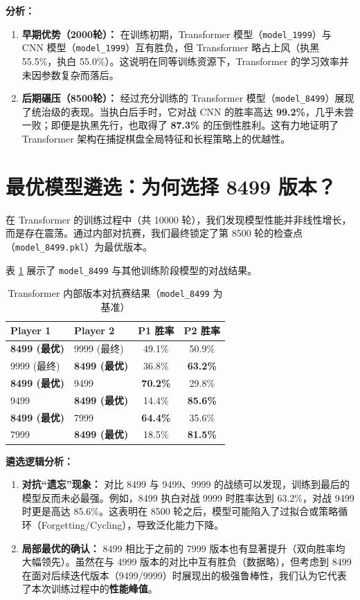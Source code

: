 \documentclass[oneside]{ctexbook}
\begin{document}
\textbf{分析：}
\begin{enumerate}
    \item \textbf{早期优势（2000轮）：} 在训练初期，Transformer 模型（\texttt{model\_1999}）与 CNN 模型（\texttt{model\_1999}）互有胜负，但 Transformer 略占上风（执黑 55.5\%，执白 55.0\%）。这说明在同等训练资源下，Transformer 的学习效率并未因参数复杂而落后。
    \item \textbf{后期碾压（8500轮）：} 经过充分训练的 Transformer 模型（\texttt{model\_8499}）展现了统治级的表现。当执白后手时，它对战 CNN 的胜率高达 \textbf{99.2\%}，几乎未尝一败；即便是执黑先行，也取得了 \textbf{87.3\%} 的压倒性胜利。这有力地证明了 Transformer 架构在捕捉棋盘全局特征和长程策略上的优越性。
\end{enumerate}

\section{最优模型遴选：为何选择 8499 版本？}

在 Transformer 的训练过程中（共 10000 轮），我们发现模型性能并非线性增长，而是存在震荡。通过内部对抗赛，我们最终锁定了第 8500 轮的检查点（\texttt{model\_8499.pkl}）为最优版本。

表 \ref{tab:internal_eval} 展示了 \texttt{model\_8499} 与其他训练阶段模型的对战结果。

\begin{table}[H]
\centering
\caption{Transformer 内部版本对抗赛结果（\texttt{model\_8499} 为基准）}
\label{tab:internal_eval}
\begin{tabular}{@{}llcc@{}}
\toprule
\textbf{Player 1} & \textbf{Player 2} & \textbf{P1 胜率} & \textbf{P2 胜率} \\ \midrule
\textbf{8499 (最优)} & 9999 (最终)     & 49.1\% & 50.9\% \\
9999 (最终)     & \textbf{8499 (最优)} & 36.8\% & \textbf{63.2\%} \\ \midrule
\textbf{8499 (最优)} & 9499           & \textbf{70.2\%} & 29.8\% \\
9499           & \textbf{8499 (最优)} & 14.4\% & \textbf{85.6\%} \\ \midrule
\textbf{8499 (最优)} & 7999           & \textbf{64.4\%} & 35.6\% \\
7999           & \textbf{8499 (最优)} & 18.5\% & \textbf{81.5\%} \\ \bottomrule
\end{tabular}
\end{table}

\textbf{遴选逻辑分析：}
\begin{enumerate}
    \item \textbf{对抗“遗忘”现象：} 对比 8499 与 9499、9999 的战绩可以发现，训练到最后的模型反而未必最强。例如，8499 执白对战 9999 时胜率达到 63.2\%，对战 9499 时更是高达 85.6\%。这表明在 8500 轮之后，模型可能陷入了过拟合或策略循环（Forgetting/Cycling），导致泛化能力下降。
    \item \textbf{局部最优的确认：} 8499 相比于之前的 7999 版本也有显著提升（双向胜率均大幅领先）。虽然在与 4999 版本的对比中互有胜负（数据略），但考虑到 8499 在面对后续迭代版本（9499/9999）时展现出的极强鲁棒性，我们认为它代表了本次训练过程中的\textbf{性能峰值}。
\end{enumerate}
\end{document}

